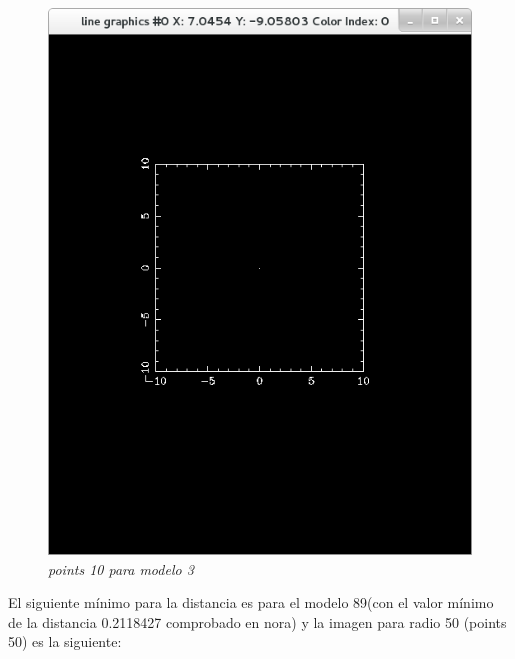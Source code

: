 \documentclass[12pt]{book}
\begin{document}
\begin{itemize}
\begin{figure}[!h]
 \centering
 \includegraphics[scale=0.5]{imgConModel3Points10.png}
 \caption{\emph{points 10 para modelo 3}}
 \label{Fig: 4}
\end{figure}

El siguiente  mínimo para la distancia es para el modelo 89(con el valor mínimo de la distancia 0.2118427 comprobado en nora) y la imagen para radio 50 (points 50) es la siguiente:


\end{itemize}
\end{document}
